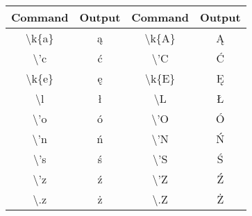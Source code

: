 \documentclass[a4paper,12pt]{article}
\begin{document}
\begin{tabular}{|cc|cc|}
	\hline
	Command&Output&Command&Output \\\hline
	\textbackslash k\{a\} &\k{a}&\textbackslash k\{A\}& \k{A} \\
	\textbackslash 'c&\'c&\textbackslash 'C&\'C\\
	\textbackslash k\{e\} &\k{e}&\textbackslash k\{E\}& \k{E} \\
	\textbackslash l&\l&\textbackslash L&\L \\	
	\textbackslash 'o&\'o&\textbackslash 'O&\'O\\
	\textbackslash 'n&\'n&\textbackslash 'N&\'N\\
	\textbackslash 's&\'s&\textbackslash 'S&\'S\\
	\textbackslash 'z&\'z&\textbackslash 'Z&\'Z\\
	\textbackslash .z&\.z&\textbackslash .Z&\.Z\\ \hline
\end{tabular}
\end{document}
